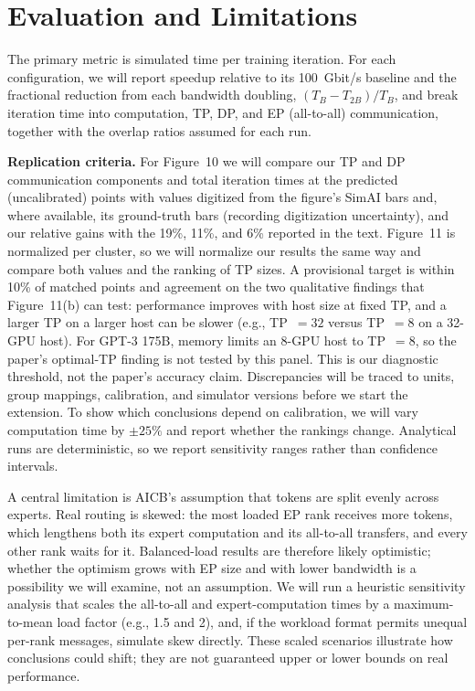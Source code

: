 \documentclass[letterpaper,twocolumn,10pt]{article}
\begin{document}
\section{Evaluation and Limitations}
The primary metric is simulated time per training iteration. For each configuration, we will report speedup relative to its 100~Gbit/s baseline and the fractional reduction from each bandwidth doubling, $(T_B-T_{2B})/T_B$, and break iteration time into computation, TP, DP, and EP (all-to-all) communication, together with the overlap ratios assumed for each run.

\textbf{Replication criteria.} For Figure~10 we will compare our TP and DP communication components and total iteration times at the predicted (uncalibrated) points with values digitized from the figure's SimAI bars and, where available, its ground-truth bars (recording digitization uncertainty), and our relative gains with the 19\%, 11\%, and 6\% reported in the text. Figure~11 is normalized per cluster, so we will normalize our results the same way and compare both values and the ranking of TP sizes. A provisional target is within 10\% of matched points and agreement on the two qualitative findings that Figure~11(b) can test: performance improves with host size at fixed TP, and a larger TP on a larger host can be slower (e.g., TP~$=32$ versus TP~$=8$ on a 32-GPU host). For GPT-3 175B, memory limits an 8-GPU host to TP~$=8$, so the paper's optimal-TP finding is not tested by this panel. This is our diagnostic threshold, not the paper's accuracy claim. Discrepancies will be traced to units, group mappings, calibration, and simulator versions before we start the extension. To show which conclusions depend on calibration, we will vary computation time by $\pm25\%$ and report whether the rankings change. Analytical runs are deterministic, so we report sensitivity ranges rather than confidence intervals.

A central limitation is AICB's assumption that tokens are split evenly across experts. Real routing is skewed: the most loaded EP rank receives more tokens, which lengthens both its expert computation and its all-to-all transfers, and every other rank waits for it. Balanced-load results are therefore likely optimistic; whether the optimism grows with EP size and with lower bandwidth is a possibility we will examine, not an assumption. We will run a heuristic sensitivity analysis that scales the all-to-all and expert-computation times by a maximum-to-mean load factor (e.g., 1.5 and 2), and, if the workload format permits unequal per-rank messages, simulate skew directly. These scaled scenarios illustrate how conclusions could shift; they are not guaranteed upper or lower bounds on real performance.
\end{document}
